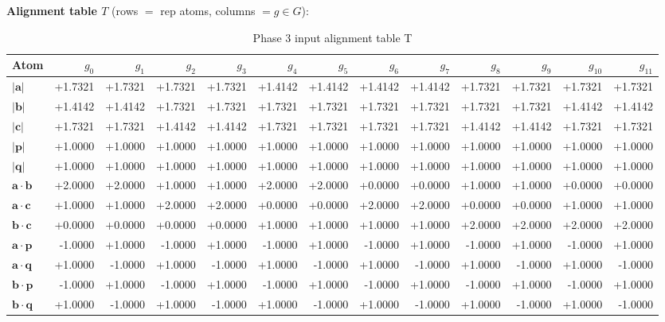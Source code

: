 \documentclass[a4paper,11pt]{article}
\newcommand{\vc}[1]{\ensuremath{\mathbf{#1}}}
\newcommand{\dnfagmiihhiejm}[1]{|\vc{#1}|}
\newcommand{\pdcegfomjfhook}[2]{\mathbf{#1} \cdot \mathbf{#2}}
\begin{document}
\textbf{Alignment table $T$} (rows $=$ rep atoms, columns $= g \in G$):\\
\begin{table}[h]\centering
\caption{Phase 3 input alignment table T}
\begin{tabular}{lrrrrrrrrrrrr}
\toprule
Atom & $g_{0}$ & $g_{1}$ & $g_{2}$ & $g_{3}$ & $g_{4}$ & $g_{5}$ & $g_{6}$ & $g_{7}$ & $g_{8}$ & $g_{9}$ & $g_{10}$ & $g_{11}$ \\
\midrule
$\dnfagmiihhiejm{a}$ & +1.7321 & +1.7321 & +1.7321 & +1.7321 & +1.4142 & +1.4142 & +1.4142 & +1.4142 & +1.7321 & +1.7321 & +1.7321 & +1.7321 \\
$\dnfagmiihhiejm{b}$ & +1.4142 & +1.4142 & +1.7321 & +1.7321 & +1.7321 & +1.7321 & +1.7321 & +1.7321 & +1.7321 & +1.7321 & +1.4142 & +1.4142 \\
$\dnfagmiihhiejm{c}$ & +1.7321 & +1.7321 & +1.4142 & +1.4142 & +1.7321 & +1.7321 & +1.7321 & +1.7321 & +1.4142 & +1.4142 & +1.7321 & +1.7321 \\
$\dnfagmiihhiejm{p}$ & +1.0000 & +1.0000 & +1.0000 & +1.0000 & +1.0000 & +1.0000 & +1.0000 & +1.0000 & +1.0000 & +1.0000 & +1.0000 & +1.0000 \\
$\dnfagmiihhiejm{q}$ & +1.0000 & +1.0000 & +1.0000 & +1.0000 & +1.0000 & +1.0000 & +1.0000 & +1.0000 & +1.0000 & +1.0000 & +1.0000 & +1.0000 \\
$\pdcegfomjfhook{a}{b}$ & +2.0000 & +2.0000 & +1.0000 & +1.0000 & +2.0000 & +2.0000 & +0.0000 & +0.0000 & +1.0000 & +1.0000 & +0.0000 & +0.0000 \\
$\pdcegfomjfhook{a}{c}$ & +1.0000 & +1.0000 & +2.0000 & +2.0000 & +0.0000 & +0.0000 & +2.0000 & +2.0000 & +0.0000 & +0.0000 & +1.0000 & +1.0000 \\
$\pdcegfomjfhook{b}{c}$ & +0.0000 & +0.0000 & +0.0000 & +0.0000 & +1.0000 & +1.0000 & +1.0000 & +1.0000 & +2.0000 & +2.0000 & +2.0000 & +2.0000 \\
$\pdcegfomjfhook{a}{p}$ & -1.0000 & +1.0000 & -1.0000 & +1.0000 & -1.0000 & +1.0000 & -1.0000 & +1.0000 & -1.0000 & +1.0000 & -1.0000 & +1.0000 \\
$\pdcegfomjfhook{a}{q}$ & +1.0000 & -1.0000 & +1.0000 & -1.0000 & +1.0000 & -1.0000 & +1.0000 & -1.0000 & +1.0000 & -1.0000 & +1.0000 & -1.0000 \\
$\pdcegfomjfhook{b}{p}$ & -1.0000 & +1.0000 & -1.0000 & +1.0000 & -1.0000 & +1.0000 & -1.0000 & +1.0000 & -1.0000 & +1.0000 & -1.0000 & +1.0000 \\
$\pdcegfomjfhook{b}{q}$ & +1.0000 & -1.0000 & +1.0000 & -1.0000 & +1.0000 & -1.0000 & +1.0000 & -1.0000 & +1.0000 & -1.0000 & +1.0000 & -1.0000 \\

\end{tabular}
\end{table}
\end{document}
